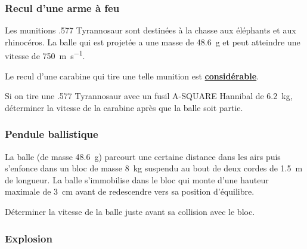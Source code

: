 \documentclass{beamer}
\begin{document}
\begin{frame}
  \frametitle{Recul d'une arme à feu}

  Les munitions .577 Tyrannosaur sont destinées à la chasse aux éléphants et
  aux rhinocéros.  La balle qui est projetée a une masse de \SI{48.6}{\gram} et
  peut atteindre une vitesse de \SI{750}{\meter\per\second}.

  Le recul d'une carabine qui tire une telle munition est
  \textbf{\href{https://www.youtube.com/watch?v=-EVqT3XEzss}{considérable}}.

  Si on tire une .577 Tyrannosaur avec un fusil A-SQUARE Hannibal de
  \SI{6.2}{\kilogram}, déterminer la vitesse de la carabine après que la balle
  soit partie.


\end{frame}


\begin{frame}
  \frametitle{Pendule ballistique}

  La balle (de masse \SI{48.6}{\gram}) parcourt une certaine distance dans les
  airs puis s'enfonce dans un bloc de masse \SI{8}{\kilogram} suspendu au bout
  de deux cordes de \SI{1.5}{\meter} de longueur.  La balle s'immobilise dans
  le bloc qui monte d'une hauteur maximale de \SI{3}{\centi\meter} avant de
  redescendre vers sa position d'équilibre.

  Déterminer la vitesse de la balle juste avant sa collision avec le bloc.

  \begin{center}
  \end{center}

\end{frame}


\begin{frame}
  \frametitle{Explosion}
\end{frame}
  
\end{document}
